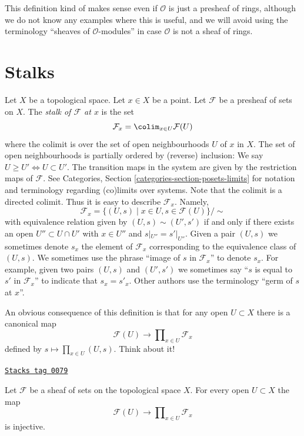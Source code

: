 This definition kind of makes sense even if $\mathcal{O}$ is just a
presheaf of rings, although we do not know any examples where
this is useful, and we will avoid using the terminology
``sheaves of $\mathcal{O}$-modules''
in case $\mathcal{O}$ is not a sheaf of rings.

\section{Stalks}
\label{sheaves-section-stalks}
Let $X$ be a topological space. Let $x \in X$ be a point.
Let $\mathcal{F}$ be a presheaf of sets on $X$.
The {\it stalk of $\mathcal{F}$ at $x$} is the set
$$
\mathcal{F}_x
=
\colim_{x\in U} \mathcal{F}(U)
$$
where the colimit is over the set of open neighbourhoods
$U$ of $x$ in $X$. The set of open neighbourhoods is
partially ordered by (reverse) inclusion:
We say $U \geq U' \Leftrightarrow U \subset U'$.
The transition maps in the system are
given by the restriction maps of $\mathcal{F}$.
See Categories, Section \ref{categories-section-posets-limits}
for notation and terminology regarding (co)limits over systems.
Note that the colimit is a directed colimit.
Thus it is easy to describe $\mathcal{F}_x$. Namely,
$$
\mathcal{F}_x
=
\{
(U, s)
\mid
x\in U, s\in \mathcal{F}(U)
\}/\sim
$$
with equivalence relation given by $(U, s) \sim (U', s')$ if and only if
there exists an open $U'' \subset U \cap U'$ with $x \in U''$ and
$s|_{U''} = s'|_{U''}$. Given a pair $(U, s)$ we sometimes denote
$s_x$ the element of $\mathcal{F}_x$ corresponding to the equivalence
class of $(U, s)$. We sometimes use the phrase
``image of $s$ in $\mathcal{F}_x$'' to denote $s_x$.
For example, given two pairs $(U, s)$ and $(U', s')$ we sometimes
say ``$s$ is equal to $s'$ in $\mathcal{F}_x$'' to indicate
that $s_x = s'_x$. Other authors use the terminology
``germ of $s$ at $x$''.

\medskip\noindent
An obvious consequence of this definition is that
for any open $U \subset X$ there is a canonical map
$$
\mathcal{F}(U)
\longrightarrow
\prod\nolimits_{x \in U} \mathcal{F}_x
$$
defined by $s \mapsto \prod_{x \in U} (U, s)$. Think about it!

\begin{lemma}
\label{sheaves-lemma-sheaf-subset-stalks}
\href{https://stacks.math.columbia.edu/tag/0079}{\texttt{Stacks tag 0079}}

Let $\mathcal{F}$ be a sheaf of sets on the topological space $X$.
For every open $U \subset X$ the map
$$
\mathcal{F}(U)
\longrightarrow
\prod\nolimits_{x \in U} \mathcal{F}_x
$$
is injective.
\end{lemma}

